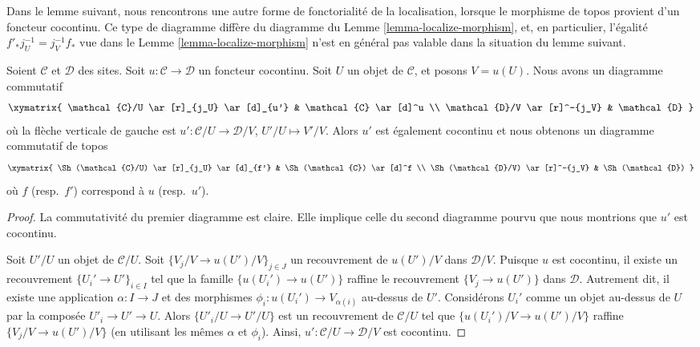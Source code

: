 \noindent
Dans le lemme suivant, nous rencontrons une autre forme de fonctorialité de la
localisation, lorsque le morphisme de topos provient d’un
foncteur cocontinu. Ce type de diagramme diffère
du diagramme du
Lemme \ref{lemma-localize-morphism},
et, en particulier, l’égalité $f'_*j_U^{-1} = j_V^{-1}f_*$ vue dans le
Lemme \ref{lemma-localize-morphism}
n’est en général pas valable dans la situation du lemme suivant.

\begin{lemma}
\label{lemma-localize-cocontinuous}
Soient $\mathcal{C}$ et $\mathcal{D}$ des sites.
Soit $u : \mathcal{C} \to \mathcal{D}$ un foncteur cocontinu.
Soit $U$ un objet de $\mathcal{C}$, et posons $V = u(U)$.
Nous avons un diagramme commutatif
$$
\xymatrix{
\mathcal{C}/U \ar[r]_{j_U} \ar[d]_{u'} & \mathcal{C} \ar[d]^u \\
\mathcal{D}/V \ar[r]^-{j_V} & \mathcal{D}
}
$$
où la flèche verticale de gauche est
$u' : \mathcal{C}/U \to \mathcal{D}/V$, $U'/U \mapsto V'/V$.
Alors $u'$ est également cocontinu et nous obtenons un diagramme commutatif de topos
$$
\xymatrix{
\Sh(\mathcal{C}/U) \ar[r]_{j_U} \ar[d]_{f'} &
\Sh(\mathcal{C}) \ar[d]^f \\
\Sh(\mathcal{D}/V) \ar[r]^-{j_V} &
\Sh(\mathcal{D})
}
$$
où $f$ (resp.\ $f'$) correspond à $u$ (resp.\ $u'$).
\end{lemma}

\begin{proof}
La commutativité du premier diagramme est claire.
Elle implique celle du second diagramme pourvu que nous
montrions que $u'$ est cocontinu.

\medskip\noindent
Soit $U'/U$ un objet de $\mathcal{C}/U$.
Soit $\{V_j/V \to u(U')/V\}_{j \in J}$ un recouvrement de $u(U')/V$
dans $\mathcal{D}/V$. Puisque $u$ est cocontinu, il existe un
recouvrement $\{U_i' \to U'\}_{i \in I}$ tel que la famille
$\{u(U_i') \to u(U')\}$ raffine le recouvrement
$\{V_j \to u(U')\}$ dans $\mathcal{D}$. Autrement dit, il existe
une application $\alpha : I \to J$ et des morphismes
$\phi_i : u(U_i') \to V_{\alpha(i)}$ au-dessus de $U'$.
Considérons $U_i'$ comme un objet au-dessus de
$U$ par la composée $U'_i \to U' \to U$. Alors
$\{U'_i/U \to U'/U\}$ est un recouvrement de $\mathcal{C}/U$ tel que
$\{u(U_i')/V \to u(U')/V\}$ raffine $\{V_j/V \to u(U')/V\}$
(en utilisant les mêmes $\alpha$ et $\phi_i$). Ainsi,
$u' : \mathcal{C}/U \to \mathcal{D}/V$ est cocontinu.
\end{proof}

